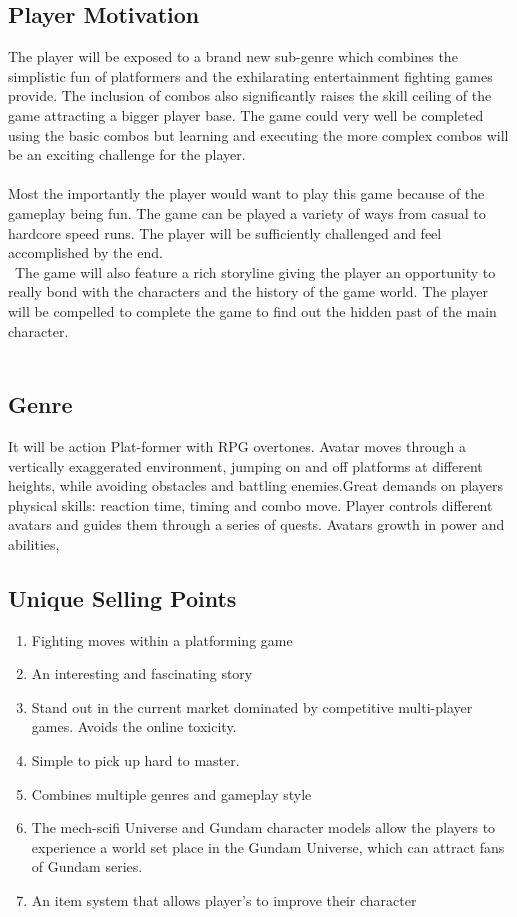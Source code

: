 \documentclass{article}
\begin{document}
\subsection*{Player Motivation}
The player will be exposed to a brand new sub-genre which combines the simplistic fun of platformers and the exhilarating entertainment fighting games provide. The inclusion of combos also significantly raises the skill ceiling of the game attracting a bigger player base. The game could very well be completed using the basic combos but learning and executing the more complex combos will be an exciting challenge for the player.\\\\
Most the importantly the player would want to play this game because of the gameplay being fun. The game can be played a variety of ways from casual to hardcore speed runs. The player will be sufficiently challenged and feel accomplished by the end.\\\
 The game will also feature a rich storyline giving the player an opportunity to really bond with the characters and the history of the game world. The player will be compelled to complete the game to find out the hidden past of the main character. \\\\


\subsection*{Genre}
It will be action Plat-former with RPG overtones. Avatar moves through a vertically exaggerated environment, jumping on and off platforms at different heights, while avoiding obstacles and battling enemies.Great demands on players physical skills: reaction time, timing and combo move.
Player controls different avatars and guides them through a series of quests. Avatars growth in power and abilities,

\subsection*{Unique Selling Points}
    \begin{enumerate}
        \item Fighting moves within a platforming game
        \item An interesting and fascinating story 
        \item Stand out in the current market dominated by competitive multi-player games. Avoids the online toxicity.
        \item Simple to pick up hard to master.
        \item Combines multiple genres and gameplay style
        \item The mech-scifi Universe and Gundam character models allow the players to experience a world set place in the Gundam Universe, which can attract fans of Gundam series.
        \item An item system that allows player's to improve their character 
    \end{enumerate}
\end{document}
